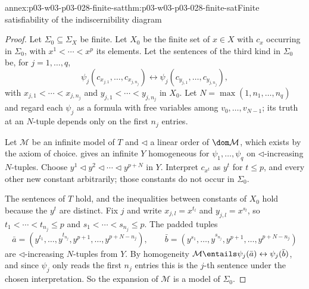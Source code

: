 \begin{annexitem}{annex:p03-w03-p03-028-finite-sat}{thm:p03-w03-p03-028-finite-sat}{Finite satisfiability of the indiscernibility diagram}
\begin{proof}
Let \(\Sigma_0\subseteq\Sigma_X\) be finite.  Let \(X_0\) be the finite set
of \(x\in X\) with \(c_x\) occurring in \(\Sigma_0\), with
\(x^1<\cdots<x^p\) its elements.  Let the sentences of the third kind in
\(\Sigma_0\) be, for \(j=1,\ldots,q\),
\[
 \psi_j(c_{x_{j,1}},\ldots,c_{x_{j,n_j}})\leftrightarrow
 \psi_j(c_{y_{j,1}},\ldots,c_{y_{j,n_j}}),
\]
with \(x_{j,1}<\cdots<x_{j,n_j}\) and \(y_{j,1}<\cdots<y_{j,n_j}\) in
\(X_0\).  Let \(N=\max(1,n_1,\ldots,n_q)\) and regard each \(\psi_j\) as a
formula with free variables among \(v_0,\ldots,v_{N-1}\); its truth at an
\(N\)-tuple depends only on the first \(n_j\) entries.

Let \(\mathcal M\) be an infinite model of \(T\) and \(\lhd\) a linear
order of \(\dom\mathcal M\), which exists by the axiom of choice.
 gives an infinite \(Y\) homogeneous
for \(\psi_1,\ldots,\psi_q\) on \(\lhd\)-increasing \(N\)-tuples.  Choose
\(y^1\lhd y^2\lhd\cdots\lhd y^{p+N}\) in \(Y\).  Interpret \(c_{x^t}\) as
\(y^t\) for \(t\leq p\), and every other new constant arbitrarily; those
constants do not occur in \(\Sigma_0\).

The sentences of \(T\) hold, and the inequalities between constants of
\(X_0\) hold because the \(y^t\) are distinct.  Fix \(j\) and write
\(x_{j,l}=x^{t_l}\) and \(y_{j,l}=x^{s_l}\), so \(t_1<\cdots<t_{n_j}\leq p\)
and \(s_1<\cdots<s_{n_j}\leq p\).  The padded tuples
\[
 \bar a=(y^{t_1},\ldots,y^{t_{n_j}},y^{p+1},\ldots,y^{p+N-n_j}),
 \qquad
 \bar b=(y^{s_1},\ldots,y^{s_{n_j}},y^{p+1},\ldots,y^{p+N-n_j})
\]
are \(\lhd\)-increasing \(N\)-tuples from \(Y\).  By homogeneity
\(\mathcal M\entails\psi_j(\bar a)\leftrightarrow\psi_j(\bar b)\), and
since \(\psi_j\) only reads the first \(n_j\) entries this is the
\(j\)-th sentence under the chosen interpretation.  So the expansion of
\(\mathcal M\) is a model of \(\Sigma_0\).
\end{proof}
\end{annexitem}

